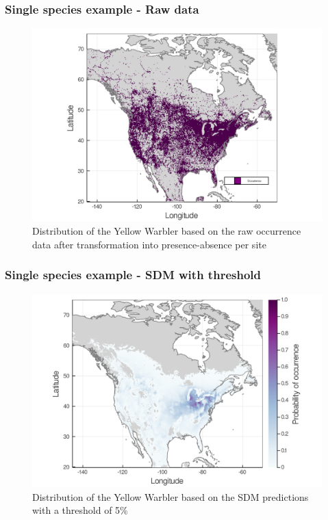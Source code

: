 \documentclass[10pt]{beamer}
\begin{document}
\begin{frame}
  \frametitle{Single species example - Raw data}
  \begin{figure}
    \centering
    \hspace*{-0cm}\includegraphics[scale=0.17]{fig/01_raw_singlesp.png}
    \caption{Distribution of the Yellow Warbler based on the raw occurrence data after transformation into presence-absence per site}
  \end{figure}
\end{frame}

\begin{frame}
  \frametitle{Single species example - SDM with threshold}
  \begin{figure}
    \centering
    \hspace*{-0cm}\includegraphics[scale=0.17]{fig/01_sdm_singlesp-threshold.png}
    \caption{Distribution of the Yellow Warbler based on the SDM predictions with a threshold of 5\%}
  \end{figure}
\end{frame}
\end{document}
